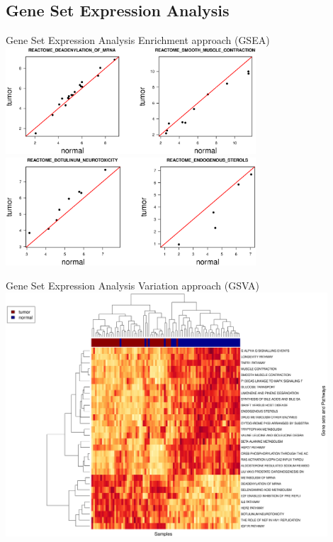 \documentclass{beamer}
\begin{document}
\subsection{Gene Set Expression Analysis}

\begin{frame}{Gene Set Expression Analysis}{ Enrichment approach (GSEA)}
  \centering 
    \includegraphics[width=0.7\textwidth,height=0.5\textheight,keepaspectratio]{genesets1.eps} \\
    \includegraphics[width=0.7\textwidth,height=0.5\textheight,keepaspectratio]{genesets2.eps}
\end{frame}

\begin{frame}{Gene Set Expression Analysis}{ Variation  approach (GSVA)}
        \includegraphics[width=0.9\textwidth,height=0.8\textheight,keepaspectratio]{ClusteringGSVA.eps}

\end{frame}
\end{document}
